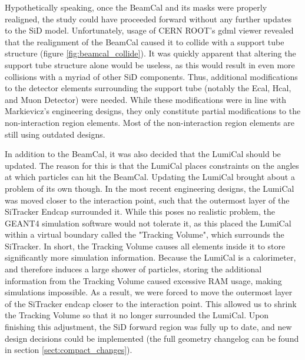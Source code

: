 \documentclass{report}
\begin{document}
            Hypothetically speaking, once the BeamCal and its masks were properly realigned, the study could have proceeded forward without any further updates to the SiD model. Unfortunately, usage of CERN ROOT's gdml viewer revealed that the realignment of the BeamCal caused it to collide with a support tube structure (figure \ref{fig:beamcal_collide}). It was quickly apparent that altering the support tube structure alone would be useless, as this would result in even more collisions with a myriad of other SiD components. Thus, additional modifications to the detector elements surrounding the support tube (notably the Ecal, Hcal, and Muon Detector) were needed. While these modifications were in line with Markievicz's engineering designs, they only constitute partial modifications to the non-interaction region elements. Most of the non-interaction region elements are still using outdated designs.

            In addition to the BeamCal, it was also decided that the LumiCal should be updated. The reason for this is that the LumiCal places constraints on the angles at which particles can hit the BeamCal. Updating the LumiCal brought about a problem of its own though. In the most recent engineering designs, the LumiCal was moved closer to the interaction point, such that the outermost layer of the SiTracker Endcap surrounded it. While this poses no realistic problem, the GEANT4 simulation software would not tolerate it, as this placed the LumiCal within a virtual boundary called the "Tracking Volume", which surrounds the SiTracker. In short, the Tracking Volume causes all elements inside it to store significantly more simulation information. Because the LumiCal is a calorimeter, and therefore induces a large shower of particles, storing the additional information from the Tracking Volume caused excessive RAM usage, making simulations impossible. As a result, we were forced to move the outermost layer of the SiTracker endcap closer to the interaction point. This allowed us to shrink the Tracking Volume so that it no longer surrounded the LumiCal. Upon finishing this adjustment, the SiD forward region was fully up to date, and new design decisions could be implemented (the full geometry changelog can be found in section \ref{sect:compact_changes}).
\end{document}
